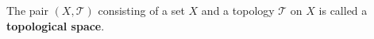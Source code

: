 The pair $(X, \mathcal{T})$ consisting of a set $X$ and a topology $\mathcal{T}$ on $X$ is called a \textbf{topological space}.
